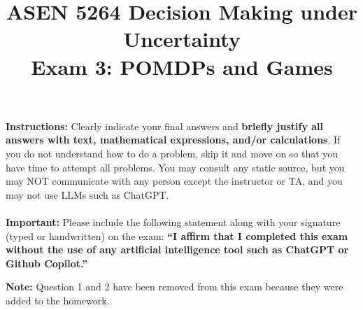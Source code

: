 \documentclass{article}
\title{ASEN 5264 Decision Making under Uncertainty\\
       Exam 3: POMDPs and Games}
\theoremstyle{definition}
\begin{document}
\maketitle


\noindent \textbf{Instructions:} Clearly indicate your final answers and \textbf{briefly justify all answers with text, mathematical expressions, and/or calculations}. If you do not understand how to do a problem, skip it and move on so that you have time to attempt all problems. You may consult any static source, but you may NOT communicate with any person except the instructor or TA, and you may not use LLMs such as ChatGPT.
\\
\\
\noindent\textbf{Important:} Please include the following statement along with your signature (typed or handwritten) on the exam: \textbf{``I affirm that I completed this exam without the use of any artificial intelligence tool such as ChatGPT or Github Copilot.''}

\clearpage

\noindent\textbf{Note:} Question 1 and 2 have been removed from this exam because they were added to the homework.
\end{document}
